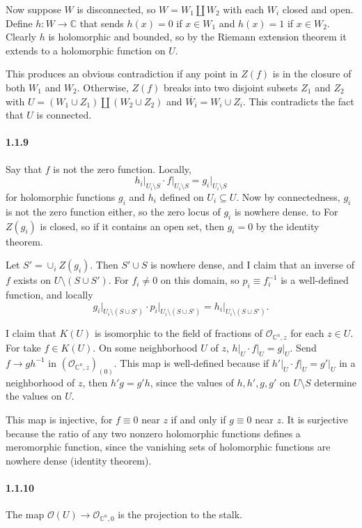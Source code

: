 \documentclass[10pt,letter]{article}
\begin{document}
Now suppose $W$ is disconnected, so $W = W_1 \coprod W_2$ with each $W_i$ closed and open. Define $h: W \rightarrow  \mathbb{C}$ that sends $h(x) = 0$ if $x \in W_1$ and $h(x) = 1$ if $x \in W_2$. Clearly $h$ is holomorphic and bounded, so by the Riemann extension theorem it extends to a holomorphic function on $U$. 

This produces an obvious contradiction if any point in $Z(f)$ is in the closure of both $W_1$ and $W_2$. Otherwise, $Z(f)$ breaks into two disjoint subsets $Z_1$ and $Z_2$ with $U = (W_1 \cup Z_1) \coprod (W_2 \cup Z_2)$ and $\overline{W_i} = W_i \cup Z_i$. This contradicts the fact that $U$ is connected. 
\paragraph*{1.1.9} Say that $f$ is not the zero function. Locally, \[ h_i \vert_{U_i\setminus S} \cdot f\vert_{U_i\setminus S}  = g_i \vert_{U_i\setminus S} \] 
for holomorphic functions $g_i$ and $h_i$ defined on $U_i \subseteq U$. Now by connectedness, $g_i$ is not the zero function either, so the zero locus of $g_i$ is nowhere dense. to For $Z(g_i)$ is closed, so if it contains an open set, then $g_i = 0$ by the identity theorem. 

Let $S' = \cup_{i} Z(g_i)$. Then $S' \cup S$ is nowhere dense, and I claim that an inverse of $f$ exists on $U \setminus (S \cup S')$. For $f_i \neq 0$ on this domain, so $p_i \equiv f_i^{-1}$ is a well-defined function, and locally 
\[ g_i \vert_{U_i\setminus (S \cup S')} \cdot  p_i\vert_{U_i\setminus (S \cup S')} = h_i \vert_{U_i\setminus (S \cup S')}.\] 

I claim that $K(U)$ is isomorphic to the field of fractions of $\mathcal{O}_{\mathbb{C}^n,z}$ for each $z \in U$. For take $f \in K(U)$. On some neighborhood $U$ of $z$, $h \vert_U \cdot f\vert_U = g\vert_U$. Send $f \rightarrow g h^{-1}$ in $(\mathcal{O}_{\mathbb{C}^n,z})_{(0)}$. This map is well-defined because if $h'\vert_U \cdot f\vert_U = g'\vert_U$ in a neighborhood of $z$, then $h'g = g'h$, since the values of $h,h',g,g'$ on $U \setminus S$ determine the values on $U$. 

This map is injective, for $f \equiv 0$ near $z$ if and only if $g \equiv 0$ near $z$. It is surjective because the ratio of any two nonzero holomorphic functions defines a meromorphic function, since the vanishing sets of holomorphic functions are nowhere dense (identity theorem). 
\paragraph*{1.1.10} The map $\mathcal{O}(U) \rightarrow \mathcal{O}_{\mathbb{C}^n,0}$ is the projection to the stalk.
\end{document}
